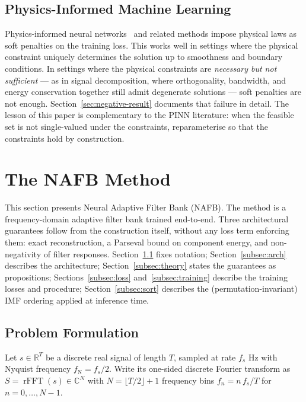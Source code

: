 \documentclass[journal]{IEEEtran}
\theoremstyle{remark}
\newcommand{\R}{\mathbb{R}}
\newcommand{\C}{\mathbb{C}}
\newcommand{\Nyq}{f_{\mathrm{N}}}
\DeclareMathOperator{\rFFT}{rFFT}
\begin{document}
\subsection{Physics-Informed Machine Learning}

Physics-informed neural networks~\cite{raissi2019pinn} and related
methods impose physical laws as soft penalties on the training loss.
This works well in settings where the physical constraint uniquely
determines the solution up to smoothness and boundary conditions. In
settings where the physical constraints are \emph{necessary but not
sufficient} --- as in signal decomposition, where orthogonality,
bandwidth, and energy conservation together still admit degenerate
solutions --- soft penalties are not enough.
Section~\ref{sec:negative-result} documents that failure in detail. The
lesson of this paper is complementary to the PINN literature: when the
feasible set is not single-valued under the constraints, reparameterise
so that the constraints hold by construction.

\section{The NAFB Method}
\label{sec:method}

This section presents Neural Adaptive Filter Bank (NAFB). The
method is a frequency-domain adaptive filter bank trained end-to-end.
Three architectural guarantees follow from the construction itself,
without any loss term enforcing them: exact reconstruction, a Parseval
bound on component energy, and non-negativity of filter responses.
Section~\ref{subsec:problem} fixes notation; Section~\ref{subsec:arch}
describes the architecture; Section~\ref{subsec:theory} states the
guarantees as propositions; Sections~\ref{subsec:loss}
and~\ref{subsec:training} describe the training losses and procedure;
Section~\ref{subsec:sort} describes the (permutation-invariant) IMF
ordering applied at inference time.

\subsection{Problem Formulation}
\label{subsec:problem}

Let $s \in \R^{T}$ be a discrete real signal of length $T$, sampled at
rate $f_{s}$ Hz with Nyquist frequency $\Nyq = f_{s}/2$. Write its
one-sided discrete Fourier transform as
$S = \rFFT(s) \in \C^{N}$ with $N = \lfloor T/2 \rfloor + 1$ frequency
bins $f_{n} = n\,f_{s}/T$ for $n = 0, \ldots, N-1$.
\end{document}
